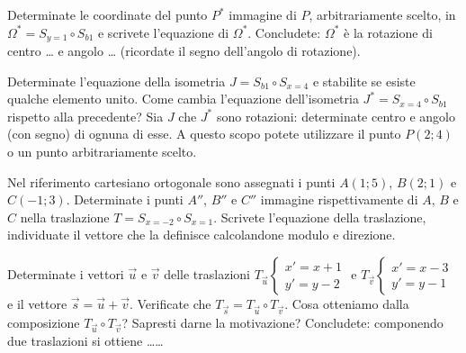 \begin{esercizio}
	\label{ese:8.72} %
	Determinate le coordinate del punto \(P^*\) immagine di \(P\), 
	arbitrariamente scelto, in \(\Omega^*=S_{y=1} \circ S_{b1}\) e scrivete 
	l'equazione di \(\Omega^*\).
	Concludete: \(\Omega^*\) è la rotazione di centro \ldots{} e angolo 
	\ldots{} (ricordate il segno dell'angolo di rotazione).
\end{esercizio}

\begin{esercizio}
	\label{ese:8.73} %
	Determinate l'equazione della isometria \(J=S_{b1} \circ S_{x=4}\) e 
	stabilite se esiste qualche elemento unito. Come cambia l'equazione 
	dell'isometria \(J^*=S_{x=4} \circ S_{b1}\) rispetto alla precedente? 
	Sia \(J\) che \(J^*\) sono rotazioni: determinate centro e angolo (con 
	segno) di ognuna di esse. A questo scopo potete utilizzare il punto 
	\(P(2;4)\) o un punto arbitrariamente scelto.
\end{esercizio}

\begin{esercizio}
	\label{ese:8.76} %
	Nel riferimento cartesiano ortogonale sono assegnati i punti 
	\(A(1;5)\), \(B(2;1)\) e \(C(-1;3)\). Determinate i punti \(A''\), \(B''\) e 
	\(C''\) immagine rispettivamente di \(A\), \(B\) e \(C\) nella traslazione 
	\(T=S_{x=-2} \circ S_{x=1}\). Scrivete l'equazione della traslazione, 
	individuate il vettore che la definisce calcolandone modulo e 
	direzione.
\end{esercizio}

\begin{esercizio}
	\label{ese:8.77} %
	Determinate i vettori \(\vec{u}\) e \(\vec{v}\) delle traslazioni 
	\(T_{\vec{u}}\begin{cases}x'=x+1\\y'=y-2\end{cases}\) e 
	\(T_{\vec{v}}\begin{cases}x'=x-3\\y'=y-1\end{cases}\) e il vettore 
	\(\vec{s} = \vec{u} + \vec{v}\). Verificate che \(T_{\vec{s}} = 
	T_{\vec{u}} \circ T_{\vec{v}}\).
	Cosa otteniamo dalla composizione \(T_{\vec{u}} \circ T_{\vec{v}}\)? 
	Sapresti darne la motivazione?
	Concludete: componendo due traslazioni si ottiene \ldots\ldots{}
\end{esercizio}

